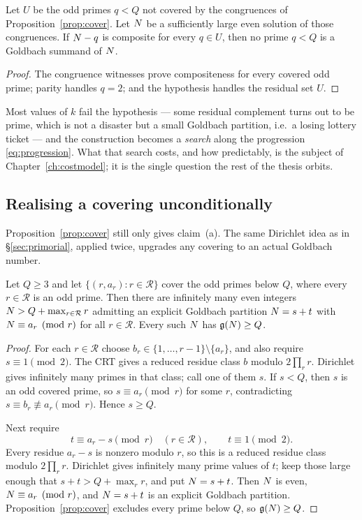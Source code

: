 \begin{proposition}\label{prop:partial}
Let $U$ be the odd primes $q<Q$ not covered by the congruences of
Proposition~\ref{prop:cover}. Let $N$ be a sufficiently large even
solution of those congruences. If $N-q$ is composite for every
$q\in U$, then no prime $q<Q$ is a Goldbach summand of $N$.
\end{proposition}
\begin{proof}
The congruence witnesses prove compositeness for every covered odd
prime; parity handles $q=2$; and the hypothesis handles the residual
set $U$.
\end{proof}

Most values of $k$ fail the hypothesis --- some residual complement
turns out to be prime, which is not a disaster but a small Goldbach
partition, i.e.\ a losing lottery ticket --- and the construction
becomes a \emph{search} along the progression \eqref{eq:progression}.
What that search costs, and how predictably, is the subject of
Chapter~\ref{ch:costmodel}; it is the single question the rest of the
thesis orbits.

\subsection{Realising a covering unconditionally}

Proposition~\ref{prop:cover} still only gives claim~(a). The same
Dirichlet idea as in \S\ref{sec:primorial}, applied twice, upgrades any
covering to an actual Goldbach number.

\begin{theorem}\label{thm:coverdirichlet}
Let $Q\ge3$ and let $\{(r,a_r):r\in\mathcal R\}$ cover the odd primes
below $Q$, where every $r\in\mathcal R$ is an odd prime. Then there are
infinitely many even integers $N>Q+\max_{r\in\mathcal R}r$ admitting an
explicit Goldbach partition $N=s+t$ with $N\equiv a_r\pmod r$ for all
$r\in\mathcal R$. Every such $N$ has $\mathfrak{g}(N)\ge Q$.
\end{theorem}
\begin{proof}
For each $r\in\mathcal R$ choose
$b_r\in\{1,\dots,r-1\}\setminus\{a_r\}$, and also require
$s\equiv1\pmod2$. The CRT gives a reduced residue class $b$ modulo
$2\prod_r r$. Dirichlet gives infinitely many primes in that class; call
one of them $s$. If $s<Q$, then $s$ is an odd covered prime, so
$s\equiv a_r\pmod r$ for some $r$, contradicting
$s\equiv b_r\not\equiv a_r\pmod r$. Hence $s\ge Q$.

Next require
\[
t\equiv a_r-s\pmod r\quad(r\in\mathcal R),\qquad t\equiv1\pmod2.
\]
Every residue $a_r-s$ is nonzero modulo $r$, so this is a reduced
residue class modulo $2\prod_r r$. Dirichlet gives infinitely many prime
values of $t$; keep those large enough that $s+t>Q+\max_r r$, and put
$N=s+t$. Then $N$ is even, $N\equiv a_r\pmod r$, and $N=s+t$ is an
explicit Goldbach partition. Proposition~\ref{prop:cover} excludes every
prime below $Q$, so $\mathfrak{g}(N)\ge Q$.
\end{proof}

